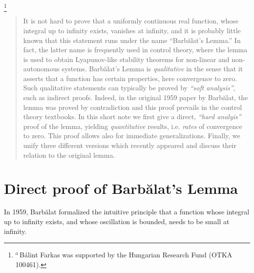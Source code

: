 \documentclass[10pt, a4paper, reqno]{amsart}
\theoremstyle{normal}
\begin{document}
\hspace{-1000pt}\footnote{\hspace{0pt}$^{a}$\,B\'{a}lint Farkas was supported by the Hungarian Research Fund (OTKA 100461).}



\begin{abstract}
	It is not hard to prove that a uniformly continuous real function, whose integral up to infinity exists, vanishes at infinity, and it is  probably little known that 	this statement runs under the name \textquotedblleft{}Barb\u{a}lat's Lemma.\textquotedblright{} In fact, the latter name is frequently used in control theory, where the lemma is used to obtain Lyapunov-like stability theorems for non-linear and non-autonomous systems. Barb\u{a}lat's Lemma is \emph{qualitative} in the sense that it asserts that a function has certain properties, here convergence to zero. Such qualitative statements can typically be proved by \emph{``soft analysis''}, such as indirect proofs. Indeed, in the original 1959 paper by Barb\u{a}lat, the lemma was proved by contradiction and this proof prevails in the control theory textbooks. In this short note we first give a direct, \emph{``hard analyis''} proof of the lemma, yielding \emph{quantitative} results, i.e.{} \emph{rates} of convergence to zero. This proof allows also for immediate generalizations. Finally, we unify three different versions which recently appeared and discuss their relation to the original lemma.
\end{abstract}

\maketitle




\section{Direct proof of Barb\u{a}lat's Lemma}\label{SEC-I}


In 1959, Barb\u{a}lat formalized the intuitive principle that a function whose integral up to infinity exists, and whose oscillation is bounded, needs to be small at infinity.
\end{document}
